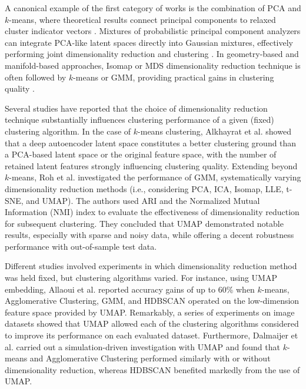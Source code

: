 \documentclass[preprint,12pt]{elsarticle}
\begin{document}
A canonical example of the first category of works is the combination of PCA and $k$-means, where theoretical results connect principal components to relaxed cluster indicator vectors \cite{ding2004kmeanspca}. Mixtures of probabilistic principal component analyzers can integrate PCA-like latent spaces directly into Gaussian mixtures, effectively performing joint dimensionality reduction and clustering \cite{tipping1999mppca}. In geometry-based and manifold-based approaches, Isomap or MDS dimensionality reduction technique is often followed by $k$-means or GMM, providing practical gains in clustering quality
\cite{tseng2023isomapkmeans}.

Several studies have reported that the choice of dimensionality reduction technique substantially influences clustering performance of a given (fixed) clustering algorithm. In the case of $k$-means clustering, Alkhayrat et al. \cite{alkhayrat2020comparative} showed that a deep autoencoder latent space constitutes a better clustering ground than a PCA-based latent space or the original feature space, with the number of retained latent features strongly influencing clustering quality. Extending beyond $k$-means, Roh et al. \cite{roh2025kche} investigated the performance of GMM, systematically varying dimensionality reduction methods (i.e., considering PCA, ICA, Isomap, LLE, t-SNE, and UMAP). The authors used ARI and the Normalized Mutual Information (NMI) index to evaluate the effectiveness of  dimensionality reduction for subsequent clustering. They concluded that UMAP demonstrated notable results, especially with sparse and noisy data, while offering a decent robustness performance with out-of-sample test data.

Different studies involved experiments in which dimensionality reduction method was held fixed, but clustering algorithms varied. For instance, using UMAP embedding, Allaoui et al. \cite{allaoui2020umap} reported accuracy gains of up to 60\% when $k$-means, Agglomerative Clustering, GMM, and HDBSCAN operated on the low-dimension feature space provided by UMAP. Remarkably, a series of experiments on image datasets showed that UMAP allowed each of the clustering algorithms considered to improve its performance on each evaluated dataset. Furthermore, Dalmaijer et al. \cite{dalmaijer2022power} carried out a simulation-driven investigation with UMAP and found that $k$-means and Agglomerative Clustering performed similarly with or without dimensionality reduction, whereas HDBSCAN benefited markedly from the use of UMAP.
\end{document}
